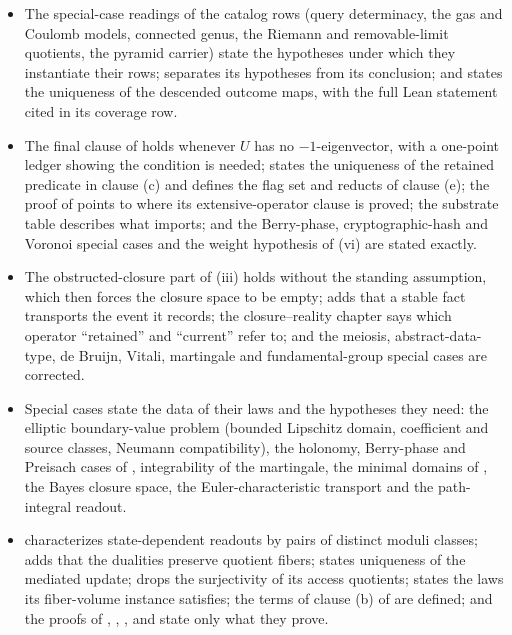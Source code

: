 \begin{itemize}
  Stability and Symmetry chapters are titled with their nonclaims; the proof
  of  calls its identity the projection identity; and the general
  clause of  names its hypotheses.
\item The special-case readings of the catalog rows (query determinacy, the
  gas and Coulomb models, connected genus, the Riemann and removable-limit
  quotients, the pyramid carrier) state the hypotheses under which they
  instantiate their rows;  separates its hypotheses from its
  conclusion; and  states the uniqueness of the descended
  outcome maps, with the full Lean statement cited in its coverage row.
\item The final clause of  holds whenever \(U\) has no
  \(-1\)-eigenvector, with a one-point ledger showing the condition is needed;
   states the uniqueness of the retained predicate in clause (c)
  and defines the flag set and reducts of clause (e); the proof of
   points to where its extensive-operator clause is
  proved; the substrate table describes what  imports; and the
  Berry-phase, cryptographic-hash and Voronoi special cases and the weight
  hypothesis of (vi) are stated exactly.
\item The obstructed-closure part of (iii) holds without the
  standing assumption, which then forces the closure space to be empty;
   adds that a stable fact transports the event it records;
  the closure--reality chapter says which operator ``retained'' and
  ``current'' refer to; and the meiosis, abstract-data-type, de Bruijn,
  Vitali, martingale and fundamental-group special cases are corrected.
\item Special cases state the data of their laws and the hypotheses they
  need: the elliptic boundary-value problem (bounded Lipschitz domain,
  coefficient and source classes, Neumann compatibility), the holonomy,
  Berry-phase and Preisach cases of , integrability of the
  martingale, the minimal domains of , the Bayes closure space,
  the Euler-characteristic transport and the path-integral readout.
\item {} characterizes state-dependent readouts by pairs of
  distinct moduli classes;  adds that the dualities preserve
  quotient fibers;  states uniqueness of the mediated update;
   drops the surjectivity of its access quotients;
   states the laws its fiber-volume instance satisfies; the
  terms of clause (b) of  are defined; and the proofs of
  , , ,  and
   state only what they prove.
\end{itemize}

